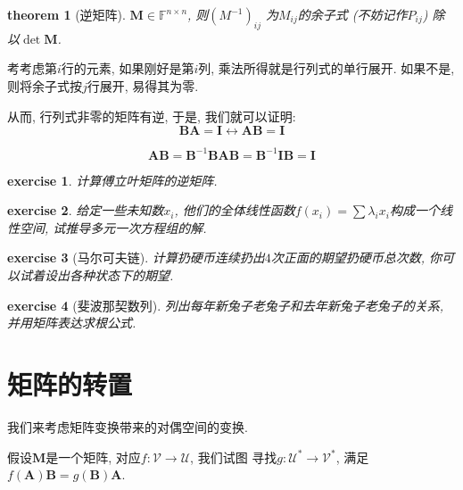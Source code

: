 \documentclass[12pt]{ctexbook}
\numberwithin{definition}{section}
\newtheorem{theorem}{theorem}
\numberwithin{theorem}{section}
\newtheorem{exercise}{exercise}
\numberwithin{exercise}{section}
\numberwithin{example}{section}
\numberwithin{lemma}{section}
\begin{document}
    \begin{theorem}
        [逆矩阵] \(\mathbf{M} \in \mathbb{F}^{n \times n}\), 则\({(M^{-1})}_{ij}\)
        为\(M_{ij}\)的余子式 (不妨记作\(P_{ij}\)) 除以\(\det \mathbf{M}\).
    \end{theorem}

    考考虑第\(i\)行的元素, 如果刚好是第\(i\)列, 乘法所得就是行列式的单行展开.
    如果不是, 则将余子式按\(j\)行展开, 易得其为零.

    从而, 行列式非零的矩阵有逆, 于是, 我们就可以证明:
    \begin{equation}
        \mathbf{B}\mathbf{A} = \mathbf{I} \leftrightarrow \mathbf{A}\mathbf{B} = \mathbf{I}
    \end{equation}

    \begin{equation}
        \mathbf{A} \mathbf{B} = \mathbf{B}^{-1} \mathbf{B} \mathbf{A} \mathbf{B} = \mathbf{B}^{-1} \mathbf{I} \mathbf{B} = \mathbf{I}
    \end{equation}

    \begin{exercise}
        计算傅立叶矩阵的逆矩阵.
    \end{exercise}

    \begin{exercise}
        给定一些未知数\(x_i\), 他们的全体线性函数\(f(x_i) = \sum \lambda_i x_i\)构成一个线性空间, 试推导多元一次方程组的解.
    \end{exercise}

    \begin{exercise}
        [马尔可夫链] 计算扔硬币连续扔出\(4\)次正面的期望扔硬币总次数, 你可以试着设出各种状态下的期望.
    \end{exercise}

    \begin{exercise}
        [斐波那契数列] 列出每年新兔子老兔子和去年新兔子老兔子的关系, 并用矩阵表达求根公式.
    \end{exercise}

    \section{矩阵的转置}

    我们来考虑矩阵变换带来的对偶空间的变换.

    假设\(\mathbf{M}\)是一个矩阵, 对应\(f:\mathcal{V} \to \mathcal{U}\), 我们试图
    寻找\(g:\mathcal{U}^* \to \mathcal{V}^*\), 满足\(f(\boldsymbol{A}) \boldsymbol{B} = g(\boldsymbol{B}) \boldsymbol{A}\).
\end{document}
